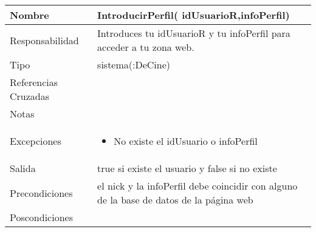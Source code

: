 \documentclass{article}
\begin{document}
\begin{table}[h]
\begin{tabular}{|l|l|l|l|l|l|}
\hline
\multicolumn{2}{|p{3cm}|}{Nombre} & \multicolumn{4}{p{10cm}|}{\textbf{IntroducirPerfil( idUsuarioR,infoPerfil)}}\\
\hline
\multicolumn{2}{|p{3cm}|}{Responsabilidad} & \multicolumn{4}{p{10cm}|}{Introduces tu idUsuarioR y tu infoPerfil para acceder a tu zona web.} \\
\hline
\multicolumn{2}{|p{3cm}|}{Tipo} & \multicolumn{4}{p{10cm}|}{sistema(:DeCine)} \\
\hline
\multicolumn{2}{|p{3cm}|}{Referencias Cruzadas} & \multicolumn{4}{p{10cm}|}{} \\
\hline
\multicolumn{2}{|p{3cm}|}{Notas} & \multicolumn{4}{p{10cm}|}{} \\
\hline
\multicolumn{2}{|p{3cm}|}{Excepciones} & \multicolumn{4}{p{10cm}|}{\begin{itemize}
\item No existe el idUsuario o infoPerfil
\end{itemize}} \\
\hline
\multicolumn{2}{|p{3cm}|}{Salida} & \multicolumn{4}{p{10cm}|}{true si existe el usuario y false si no existe} \\
\hline
\multicolumn{2}{|p{3cm}|}{Precondiciones} & \multicolumn{4}{p{10cm}|}{el nick y la infoPerfil debe coincidir con alguno de la base de datos de la página web} \\
\hline
\multicolumn{2}{|p{3cm}|}{Poscondiciones} & \multicolumn{4}{p{10cm}|}{} \\
\hline
\end{tabular}
\end{table}
\end{document}
